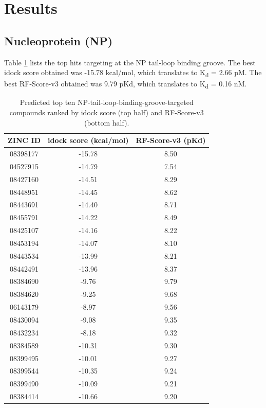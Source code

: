 \section{Results}

\subsection{Nucleoprotein (NP)}

Table \ref{influenza:2IQH-Hits-10} lists the top hits targeting at the NP tail-loop binding groove. The best idock score obtained was -15.78 kcal/mol, which translates to K\textsubscript{d} = 2.66 pM. The best RF-Score-v3 obtained was 9.79 pKd, which translates to K\textsubscript{d} = 0.16 nM.

\begin{table}
\caption{Predicted top ten NP-tail-loop-binding-groove-targeted compounds ranked by idock score (top half) and RF-Score-v3 (bottom half).}
\label{influenza:2IQH-Hits-10}
\begin{tabular}{ccc}
\hline
ZINC ID & idock score (kcal/mol) & RF-Score-v3 (pKd)\\
\hline
08398177 & -15.78 & 8.50\\
04527915 & -14.79 & 7.54\\
08427160 & -14.51 & 8.29\\
08448951 & -14.45 & 8.62\\
08443691 & -14.40 & 8.71\\
08455791 & -14.22 & 8.49\\
08425107 & -14.16 & 8.22\\
08453194 & -14.07 & 8.10\\
08443534 & -13.99 & 8.21\\
08442491 & -13.96 & 8.37\\
\hline
08384690 &  -9.76 & 9.79\\
08384620 &  -9.25 & 9.68\\
06143179 &  -8.97 & 9.56\\
08430094 &  -9.08 & 9.35\\
08432234 &  -8.18 & 9.32\\
08384589 & -10.31 & 9.30\\
08399495 & -10.01 & 9.27\\
08399544 & -10.35 & 9.24\\
08399490 & -10.09 & 9.21\\
08384414 & -10.66 & 9.20\\
\hline
\end{tabular}
\end{table}

